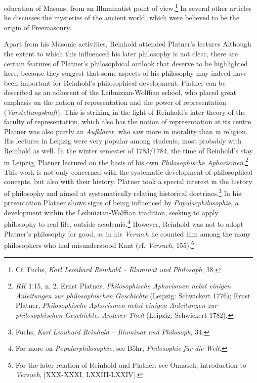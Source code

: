 education of Masons, from an Illuminatist point of view.\footnote{ Cf. Fuchs, \textit{Karl Leonhard Reinhold {--} Illuminat und Philosoph}, 38.} In several other articles he discusses the mysteries of the ancient world, which were believed to be the origin of Freemasonry. 

 Apart from his Masonic activities, Reinhold attended Platner's lectures Although the extent to which this influenced his later philosophy is not clear, there are certain features of Platner's philosophical outlook that deserve to be highlighted here, because they suggest that some aspects of his philosophy may indeed have been important for Reinhold's philosophical development. Platner can be described as an adherent of the Leibnizian{-}Wolffian school, who placed great emphasis on the notion of representation and the power of representation (\textit{Vorstellungskraft}). This is striking in the light of Reinhold's later theory of the faculty of representation, which also has the notion of representation at its centre. Platner was also partly an \textit{Aufkl\"{a}rer}, who saw more in morality than in religion. His lectures in Leipzig were very popular among students, most probably with Reinhold as well. In the winter semester of 1783/1784, the time of Reinhold's stay in Leipzig, Platner lectured on the basis of his own \textit{Philosophische Aphorismen}.\footnote{ \textit{RK }1:15, n. 2. Ernst Platner, \textit{Philosophische Aphorismen nebst einigen Anleitungen zur philosophischen Geschichte }(Leipzig: Schwickert 1776); Ernst Platner, \textit{Philosophische Aphorismen nebst einigen Anleitungen zur philosophischen Geschichte. Anderer Theil} (Leipzig: Schwickert 1782). } This work is not only concerned with the systematic development of philosophical concepts, but also with their history. Platner took a special interest in the history of philosophy and aimed at systematically relating historical doctrines.\footnote{ Fuchs, \textit{Karl Leonhard Reinhold {--} Illuminat und Philosoph}, 34.} In his presentation Platner shows signs of being influenced by \textit{Popularphilosophie}, a development within the Leibnizian{-}Wolffian tradition, seeking to apply philosophy to real life, outside academia.\footnote{ For more on \textit{Popularphilosophie}, see B\"{o}hr, \textit{Philosophie f\"{u}r die Welt}.} However, Reinhold was not to adopt Platner's philosophy for good, as in his \textit{Versuch }he counted him among the many philosophers who had misunderstood Kant (cf. \textit{Versuch}, 155).\footnote{ For the later relation of Reinhold and Platner, see Onnasch, introduction to \textit{Versuch}, [XXX{-}XXXI, LXXIII{-}LXXIV].}

